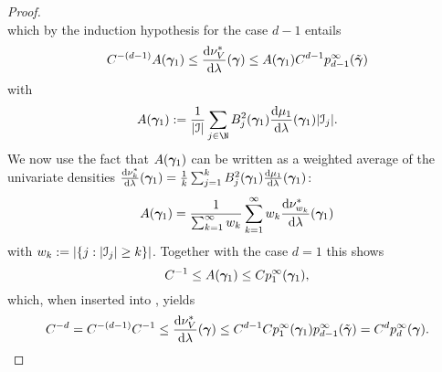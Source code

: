 \begin{proof}
\begin{equation*}
	\end{equation*}
	which by the induction hypothesis for the case $d-1$ entails
	\begin{equation}
	\label{eq:temp}
	C^{-(d-1)}A(\bm{\gamma}_1)\leq \frac{\text{d}\nu^{*}_{V}}{\text{d}\lambda}(\bm{\gamma})\leq A(\bm{\gamma}_1)C^{d-1}p^{\infty}_{d-1}(\tilde{\bm{\gamma}})
	\end{equation}
	with
	\begin{equation*}
	A(\psmi_1):=\frac{1}{|\mis|}\sum_{j\in\N}\onb_j^2(\psmi_1)\frac{\text{d}\measure_{1}}{\text{d}\lambda}(\psmi_{1})|\mis_{j}|.
	\end{equation*}
	We now use the fact that $A(\bm{\gamma}_1)$ can be written as a weighted average of the univariate densities $\frac{\text{\textup{d}}\nu^{*}_{k}}{\text{\textup{d}}\lambda}(\bm{\gamma}_1)=\frac{1}{k}\sum_{j=1}^{k}B_j^2(\bm{\gamma}_1)\frac{\text{d}\mu_{1}}{\text{d}\lambda}(\bm{\gamma}_{1})$:
	\begin{equation*}
	A(\bm{\gamma}_1)=\frac{1}{\sum_{k=1}^{\infty}{w_k}}\sum_{k=1}^{\infty}w_k\frac{\text{d}\nu^{*}_{w_k}}{\text{d}\lambda}(\bm{\gamma}_1)
	\end{equation*}
	with $w_k:=|\{j:|\mathcal{I}_{j}|\geq k\}|$.
	Together with the case $d=1$ this shows
	\begin{equation*}
	C^{-1}\leq A(\bm{\gamma}_1)\leq C p^{\infty}_{1}(\bm{\gamma}_1),
	\end{equation*}
	which, when inserted into , yields
	\begin{equation*}
	C^{-d}=C^{-(d-1)}C^{-1}\leq \frac{\text{d}\nu^{*}_{V}}{\text{d}\lambda}(\bm{\gamma})\leq C^{d-1}Cp^{\infty}_{1}(\bm{\gamma}_1)p^{\infty}_{d-1}(\tilde{\bm{\gamma}})= C^{d}p^{\infty}_{d}(\bm{\gamma}).
	\end{equation*}
\end{proof}


